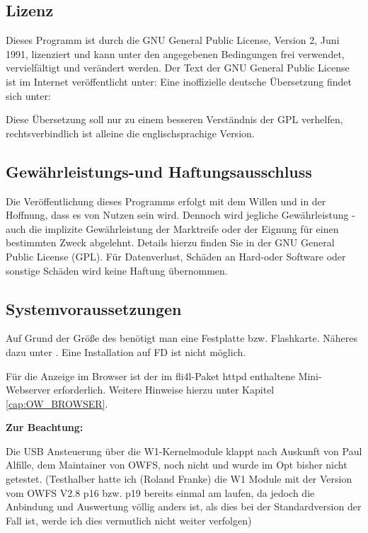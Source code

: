 \subsection{Lizenz}
Dieses Programm ist durch die GNU General Public License, Version 2, Juni 1991,
lizenziert und kann unter den angegebenen Bedingungen frei verwendet, vervielfältigt
und verändert werden. Der Text der GNU General Public License ist im Internet
veröffentlicht unter: 
Eine inoffizielle deutsche Übersetzung findet sich unter:

Diese Übersetzung soll nur zu einem besseren Verständnis der GPL verhelfen,
rechtsverbindlich ist alleine die englischsprachige Version.

\subsection{Gewährleistungs-und Haftungsausschluss}
Die Veröffentlichung dieses Programms erfolgt mit dem Willen und in der Hoffnung,
dass es von Nutzen sein wird. Dennoch wird jegliche Gewährleistung -auch die implizite
Gewährleistung der Marktreife oder der Eignung für einen bestimmten Zweck abgelehnt.
Details hierzu finden Sie in der GNU General Public License (GPL).
Für Datenverlust, Schäden an Hard-oder Software oder sonstige Schäden wird keine
Haftung übernommen.

\subsection{Systemvoraussetzungen}
Auf Grund der Größe des  benötigt man eine Festplatte bzw. Flashkarte.
Näheres dazu unter . Eine Installation auf FD ist nicht möglich.

Für die Anzeige im Browser ist der im fli4l-Paket \glqq{}httpd\grqq{} enthaltene Mini-Webserver
erforderlich. Weitere Hinweise hierzu unter Kapitel \ref{cap:OW_BROWSER}.

\textbf{Zur Beachtung:}

Die USB Ansteuerung über die W1-Kernelmodule klappt nach Auskunft von Paul Alfille,
dem Maintainer von OWFS, noch nicht und wurde im Opt bisher nicht getestet.
(Testhalber hatte ich (Roland Franke) die W1 Module mit der Version vom OWFS
V2.8 p16 bzw. p19 bereits einmal am laufen, da jedoch die Anbindung und Auswertung 
völlig anders ist, als dies bei der Standardversion der Fall ist, werde ich dies
vermutlich nicht weiter verfolgen)


